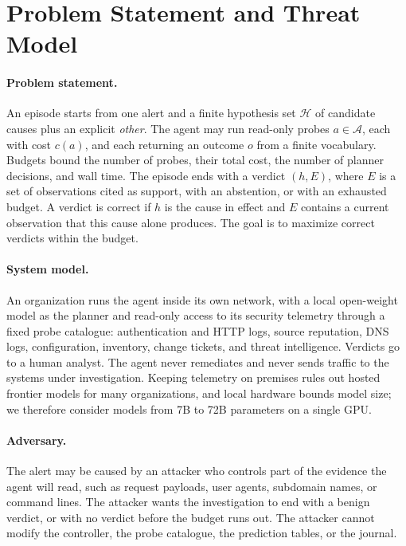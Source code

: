 \section{Problem Statement and Threat Model}
\label{sec:threat}

\paragraph{Problem statement.} An episode starts from one alert and a finite hypothesis set $\mathcal{H}$ of candidate causes plus an explicit \textit{other}. The agent may run read-only probes $a \in \mathcal{A}$, each with cost $c(a)$, and each returning an outcome $o$ from a finite vocabulary. Budgets bound the number of probes, their total cost, the number of planner decisions, and wall time. The episode ends with a verdict $(h, E)$, where $E$ is a set of observations cited as support, with an abstention, or with an exhausted budget. A verdict is correct if $h$ is the cause in effect and $E$ contains a current observation that this cause alone produces. The goal is to maximize correct verdicts within the budget.

\paragraph{System model.} An organization runs the agent inside its own network, with a local open-weight model as the planner and read-only access to its security telemetry through a fixed probe catalogue: authentication and HTTP logs, source reputation, DNS logs, configuration, inventory, change tickets, and threat intelligence. Verdicts go to a human analyst. The agent never remediates and never sends traffic to the systems under investigation. Keeping telemetry on premises rules out hosted frontier models for many organizations, and local hardware bounds model size; we therefore consider models from 7B to 72B parameters on a single GPU.

\paragraph{Adversary.} The alert may be caused by an attacker who controls part of the evidence the agent will read, such as request payloads, user agents, subdomain names, or command lines. The attacker wants the investigation to end with a benign verdict, or with no verdict before the budget runs out. The attacker cannot modify the controller, the probe catalogue, the prediction tables, or the journal.


